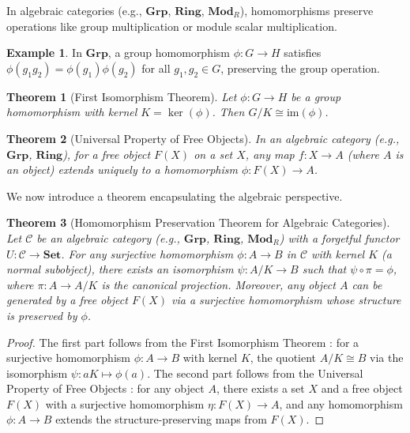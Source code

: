 \documentclass{article}
\theoremstyle{plain}
\newtheorem{theorem}{Theorem}
\theoremstyle{definition}
\newtheorem{example}{Example}
\begin{document}
In algebraic categories (e.g., \(\mathbf{Grp}\), \(\mathbf{Ring}\), \(\mathbf{Mod}_R\)), homomorphisms preserve operations like group multiplication or module scalar multiplication.

\begin{example}
In \(\mathbf{Grp}\), a group homomorphism \(\phi: G \to H\) satisfies \(\phi(g_1 g_2) = \phi(g_1) \phi(g_2)\) for all \(g_1, g_2 \in G\), preserving the group operation.
\end{example}

\begin{theorem}[First Isomorphism Theorem]
Let \(\phi: G \to H\) be a group homomorphism with kernel \(K = \ker(\phi)\). Then \(G/K \cong \text{im}(\phi)\).
\end{theorem}

\begin{theorem}[Universal Property of Free Objects]
In an algebraic category (e.g., \(\mathbf{Grp}\), \(\mathbf{Ring}\)), for a free object \(F(X)\) on a set \(X\), any map \(f: X \to A\) (where \(A\) is an object) extends uniquely to a homomorphism \(\phi: F(X) \to A\).
\end{theorem}

We now introduce a theorem encapsulating the algebraic perspective.

\begin{theorem}[Homomorphism Preservation Theorem for Algebraic Categories]
Let \(\mathcal{C}\) be an algebraic category (e.g., \(\mathbf{Grp}\), \(\mathbf{Ring}\), \(\mathbf{Mod}_R\)) with a forgetful functor \(U: \mathcal{C} \to \mathbf{Set}\). For any surjective homomorphism \(\phi: A \to B\) in \(\mathcal{C}\) with kernel \(K\) (a normal subobject), there exists an isomorphism \(\psi: A/K \to B\) such that \(\psi \circ \pi = \phi\), where \(\pi: A \to A/K\) is the canonical projection. Moreover, any object \(A\) can be generated by a free object \(F(X)\) via a surjective homomorphism whose structure is preserved by \(\phi\).
\end{theorem}

\begin{proof}
The first part follows from the First Isomorphism Theorem \cite{lang}: for a surjective homomorphism \(\phi: A \to B\) with kernel \(K\), the quotient \(A/K \cong B\) via the isomorphism \(\psi: aK \mapsto \phi(a)\). The second part follows from the Universal Property of Free Objects \cite{mac}: for any object \(A\), there exists a set \(X\) and a free object \(F(X)\) with a surjective homomorphism \(\eta: F(X) \to A\), and any homomorphism \(\phi: A \to B\) extends the structure-preserving maps from \(F(X)\).
\end{proof}
\end{document}
